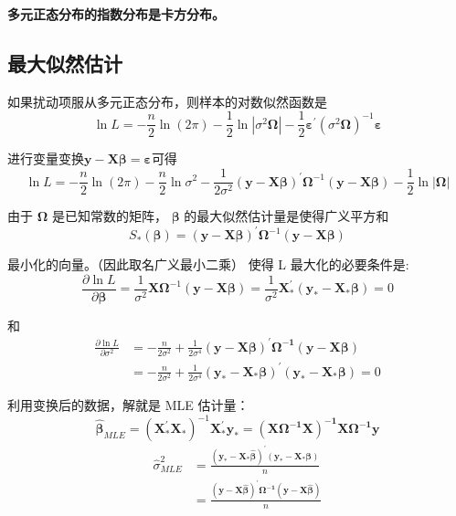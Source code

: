 {\bf 多元正态分布的指数分布是卡方分布。}

\subsection{最大似然估计}
如果扰动项服从多元正态分布，则样本的对数似然函数是
$$ \ln L=-\frac{n}{2} \ln (2 \pi)-\frac{1}{2} \ln \left|\sigma^{2} \boldsymbol{\Omega} \right|-\frac{1}{2} 
\boldsymbol{\varepsilon^{\prime}} \left(\sigma^{2} \boldsymbol{\Omega} \right)^{-1} \boldsymbol{\varepsilon} $$

进行变量变换$ \boldsymbol{y − X\beta  = \varepsilon} $可得
\begin{equation}
    \ln L = -\frac{n}{2} \ln (2 \pi)-\frac{n}{2} \ln \sigma^{2}-
    \frac{1}{2 \sigma^{2}}(\boldsymbol{y-X \beta})^{\prime} \boldsymbol{\Omega}^{-1}(\boldsymbol{y-X \beta})-\frac{1}{2} \ln |\boldsymbol{\Omega}|
\end{equation}

由于 $ \boldsymbol{\Omega} $ 是已知常数的矩阵， $ \boldsymbol{\beta} $ 的最大似然估计量是使得广义平方和
\begin{equation}
     S_{*}(\boldsymbol{\beta})=( \boldsymbol{y-X \beta} )^{\prime} \boldsymbol{\Omega}^{-1}(\boldsymbol{y-X \beta}) 
\end{equation}

最小化的向量。（因此取名广义最小二乘） 使得 L 最大化的必要条件是:
\begin{equation}
    \frac{\partial \ln L}{\partial \boldsymbol{\beta} }=\frac{1}{\sigma^{2}} \boldsymbol{X \Omega} ^{-1}(\boldsymbol{y-X \beta} )
    = \frac{1}{\sigma^{2}} \boldsymbol{X_{*}^{\prime}\left(y_{*}-X_{*} \beta\right) }=0
\end{equation}

和
\begin{equation}
    \begin{aligned}
        \frac{\partial \ln L}{\partial \sigma^{2}} & = -\frac{n}{2 \sigma^{2}} + \frac{1}{2 \sigma^{4}} \boldsymbol{(y-X \beta)^{\prime} \Omega^{-1}(y-X \beta)} \\
        & = - \frac{n}{2 \sigma^{2}}+\frac{1}{2 \sigma^{4}} \boldsymbol{ \left(y_{*}-X_{*} \beta\right)^{\prime}\left(y_{*}-X_{*} \beta\right)}=0
    \end{aligned}
\end{equation}

利用变换后的数据，解就是 MLE 估计量：
\begin{equation}
    \boldsymbol{\hat{\beta}}_{M L E} = \left(\boldsymbol{X_{*}^{\prime} X_{*}}\right)^{-1} 
    \boldsymbol{X_{*}^{\prime} y_{*}=\left(X \Omega^{-1} X\right)^{-1} X \Omega^{-1} y}
\end{equation}
\begin{equation}
    \begin{aligned}
        \hat{\sigma}_{M L E}^{2} &= \frac{\left(\boldsymbol{y_{*}-X_{*} \hat{\beta}}\right)^{\prime} 
        \left(\boldsymbol{y_{*}-X_{*} \beta}\right)}{n} \\
        &=\frac{\boldsymbol{ (y-X \hat{\beta})^{\prime} \Omega^{-1}(y-X \hat{\beta}) }}{n}
    \end{aligned}
\end{equation}

